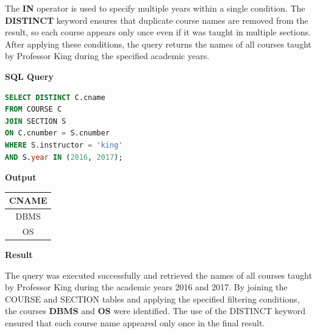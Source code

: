 \documentclass[12pt,a4paper]{report}
\begin{document}
The \textbf{IN} operator is used to specify multiple years within a single condition. The \textbf{DISTINCT} keyword ensures that duplicate course names are removed from the result, so each course appears only once even if it was taught in multiple sections. After applying these conditions, the query returns the names of all courses taught by Professor King during the specified academic years.

\vspace{0.4cm}

\textbf{SQL Query}

\begin{lstlisting}[language=SQL]
SELECT DISTINCT C.cname
FROM COURSE C
JOIN SECTION S
ON C.cnumber = S.cnumber
WHERE S.instructor = 'king'
AND S.year IN (2016, 2017);
\end{lstlisting}

\vspace{0.5cm}

\textbf{Output}

\vspace{0.3cm}

\begin{center}
\renewcommand{\arraystretch}{1.6}
\begin{tabular}{|c|}
\hline
\textbf{CNAME} \\
\hline
DBMS \\
\hline
OS \\
\hline
\end{tabular}
\end{center}

\vspace{0.7cm}

\textbf{Result}

The query was executed successfully and retrieved the names of all courses taught by Professor King during the academic years 2016 and 2017. By joining the COURSE and SECTION tables and applying the specified filtering conditions, the courses \textbf{DBMS} and \textbf{OS} were identified. The use of the DISTINCT keyword ensured that each course name appeared only once in the final result.

\newpage

\end{document}
